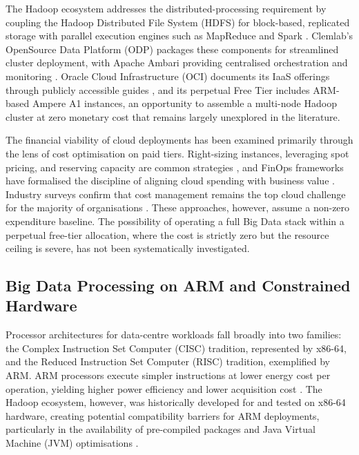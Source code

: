The Hadoop ecosystem addresses the distributed-processing requirement by coupling the
Hadoop Distributed File System (HDFS) for block-based, replicated storage with parallel execution engines such as MapReduce
and Spark \citep{hadoop_hdfs_design_2025, marz2015bigdata}. Clemlab's OpenSource Data
Platform (ODP) packages these components for streamlined cluster deployment, with
Apache Ambari providing centralised orchestration and monitoring
\citep{clemlab_odp_docs_intro_1310}. Oracle Cloud Infrastructure (OCI) documents its
IaaS offerings through publicly accessible guides \citep{oci_docs}, and its perpetual
Free Tier includes ARM-based Ampere A1 instances, an opportunity to assemble a
multi-node Hadoop cluster at zero monetary cost that remains largely unexplored in
the literature.

The financial viability of cloud deployments has been examined primarily through the
lens of cost optimisation on paid tiers. Right-sizing instances, leveraging spot
pricing, and reserving capacity are common strategies
\citep{deochake2026cloudaiinfrastructurecost}, and FinOps frameworks have formalised
the discipline of aligning cloud spending with business value
\citep{vo2025finopsagentusecase}. Industry surveys confirm that cost management
remains the top cloud challenge for the majority of organisations
\citep{flexera2025stateofcloud}. These approaches, however, assume a non-zero
expenditure baseline. The possibility of operating a full Big Data stack within a
perpetual free-tier allocation, where the cost is strictly zero but the resource
ceiling is severe, has not been systematically investigated.

\subsection{Big Data Processing on ARM and Constrained Hardware}

Processor architectures for data-centre workloads fall broadly into two families: the
Complex Instruction Set Computer (CISC) tradition, represented by x86-64, and the
Reduced Instruction Set Computer (RISC) tradition, exemplified by ARM. ARM processors
execute simpler instructions at lower energy cost per operation, yielding higher power
efficiency and lower acquisition cost \citep{hennessy2019computer}. The Hadoop ecosystem,
however, was historically developed for and tested on x86-64 hardware, creating
potential compatibility barriers for ARM deployments, particularly in the
availability of pre-compiled packages and Java Virtual Machine (JVM) optimisations \citep{8287751}.

